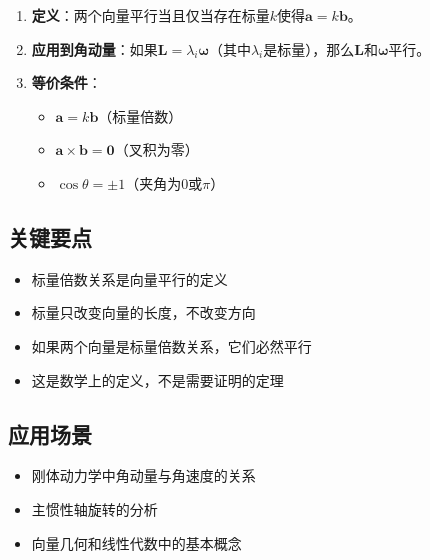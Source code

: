 \documentclass[12pt,a4paper]{article}
\begin{document}
\begin{enumerate}
\item \textbf{定义}：两个向量平行当且仅当存在标量$k$使得$\bm{a} = k \bm{b}$。

\item \textbf{应用到角动量}：如果$\bm{L} = \lambda_i \bm{\omega}$（其中$\lambda_i$是标量），那么$\bm{L}$和$\bm{\omega}$平行。

\item \textbf{等价条件}：
\begin{itemize}
\item $\bm{a} = k \bm{b}$（标量倍数）
\item $\bm{a} \times \bm{b} = \bm{0}$（叉积为零）
\item $\cos\theta = \pm 1$（夹角为$0$或$\pi$）
\end{itemize}
\end{enumerate}

\subsection{关键要点}

\begin{itemize}
\item 标量倍数关系是向量平行的定义
\item 标量只改变向量的长度，不改变方向
\item 如果两个向量是标量倍数关系，它们必然平行
\item 这是数学上的定义，不是需要证明的定理
\end{itemize}

\subsection{应用场景}

\begin{itemize}
\item 刚体动力学中角动量与角速度的关系
\item 主惯性轴旋转的分析
\item 向量几何和线性代数中的基本概念
\end{itemize}
\end{document}
